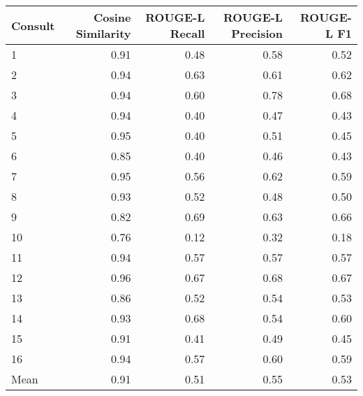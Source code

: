 \begin{tabular}{lrrrr}
\toprule
Consult & Cosine Similarity & ROUGE-L Recall & ROUGE-L Precision & ROUGE-L F1 \\
\midrule
1 & 0.91 & 0.48 & 0.58 & 0.52 \\
2 & 0.94 & 0.63 & 0.61 & 0.62 \\
3 & 0.94 & 0.60 & 0.78 & 0.68 \\
4 & 0.94 & 0.40 & 0.47 & 0.43 \\
5 & 0.95 & 0.40 & 0.51 & 0.45 \\
6 & 0.85 & 0.40 & 0.46 & 0.43 \\
7 & 0.95 & 0.56 & 0.62 & 0.59 \\
8 & 0.93 & 0.52 & 0.48 & 0.50 \\
9 & 0.82 & 0.69 & 0.63 & 0.66 \\
10 & 0.76 & 0.12 & 0.32 & 0.18 \\
11 & 0.94 & 0.57 & 0.57 & 0.57 \\
12 & 0.96 & 0.67 & 0.68 & 0.67 \\
13 & 0.86 & 0.52 & 0.54 & 0.53 \\
14 & 0.93 & 0.68 & 0.54 & 0.60 \\
15 & 0.91 & 0.41 & 0.49 & 0.45 \\
16 & 0.94 & 0.57 & 0.60 & 0.59 \\
Mean & 0.91 & 0.51 & 0.55 & 0.53 \\
\bottomrule
\end{tabular}
